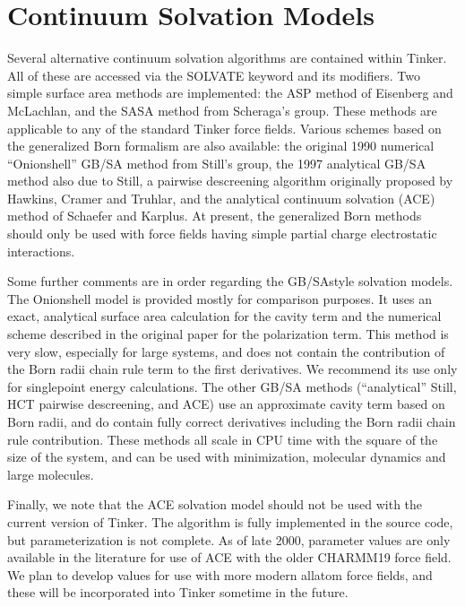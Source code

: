\documentclass[letterpaper,11pt,english]{sphinxmanual}
\begin{document}
\section{Continuum Solvation Models}
\label{\detokenize{text/special-features:continuum-solvation-models}}
Several alternative continuum solvation algorithms are contained within Tinker. All of these are accessed via the SOLVATE keyword and its modifiers. Two simple surface area methods are implemented: the ASP method of Eisenberg and McLachlan, and the SASA method from Scheraga’s group. These methods are applicable to any of the standard Tinker force fields. Various schemes based on the generalized Born formalism are also available: the original 1990 numerical “Onion\sphinxhyphen{}shell” GB/SA method from Still’s group, the 1997 analytical GB/SA method also due to Still, a pairwise descreening algorithm originally proposed by Hawkins, Cramer and Truhlar, and the analytical continuum solvation (ACE) method of Schaefer and Karplus. At present, the generalized Born methods should only be used with force fields having simple partial charge electrostatic interactions.

Some further comments are in order regarding the GB/SA\sphinxhyphen{}style solvation models. The Onion\sphinxhyphen{}shell model is provided mostly for comparison purposes. It uses an exact, analytical surface area calculation for the cavity term and the numerical scheme described in the original paper for the polarization term. This method is very slow, especially for large systems, and does not contain the contribution of the Born radii chain rule term to the first derivatives. We recommend its use only for single\sphinxhyphen{}point energy calculations. The other GB/SA methods (“analytical” Still, H\sphinxhyphen{}C\sphinxhyphen{}T pairwise descreening, and ACE) use an approximate cavity term based on Born radii, and do contain fully correct derivatives including the Born radii chain rule contribution. These methods all scale in CPU time with the square of the size of the system, and can be used with minimization, molecular dynamics and large molecules.

Finally, we note that the ACE solvation model should not be used with the current version of Tinker. The algorithm is fully implemented in the source code, but parameterization is not complete. As of late 2000, parameter values are only available in the literature for use of ACE with the older CHARMM19 force field. We plan to develop values for use with more modern all\sphinxhyphen{}atom force fields, and these will be incorporated into Tinker sometime in the future.
\end{document}
